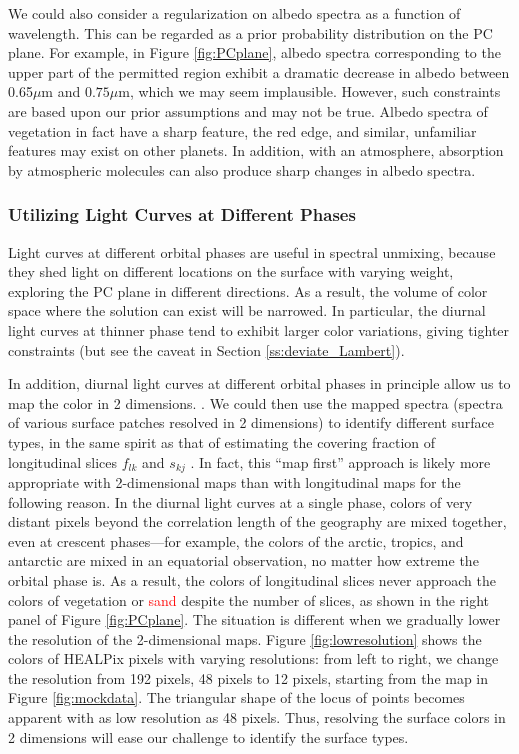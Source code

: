 \documentclass[iop,numberedappendix,apj]{emulateapj}
\def\edit#1{\textcolor{red}{#1}}
\begin{document}
We could also consider a regularization on albedo spectra as a function of wavelength. 
This can be regarded as a prior probability distribution on the PC plane. 
For example, in Figure \ref{fig:PCplane}, albedo spectra corresponding to the upper part of the permitted region exhibit a dramatic decrease in albedo between 0.65$\mu $m and $0.75\mu $m, which we may seem implausible. 
However, such constraints are based upon our prior assumptions and may not be true. 
Albedo spectra of vegetation in fact have a sharp feature, the red edge, and similar, unfamiliar features may exist on other planets. 
In addition, with an atmosphere, absorption by atmospheric molecules can also produce sharp changes in albedo spectra. 


\subsubsection{Utilizing Light Curves at Different Phases}

Light curves at different orbital phases are useful in spectral unmixing, because they shed light on different locations on the surface with varying weight, exploring the PC plane in different directions. 
As a result, the volume of color space where the solution can exist will be narrowed.  
In particular, the diurnal light curves at thinner phase tend to exhibit larger color variations, giving tighter constraints (but see the caveat in Section \ref{ss:deviate_Lambert}). 

In addition, diurnal light curves at different orbital phases in principle allow us to map the color in 2 dimensions.   \citep{Kawahara2010,Kawahara2011,Fujii2012}. 
We could then use the mapped spectra (spectra of various surface patches resolved in 2 dimensions) to identify different surface types, in the same spirit as that of estimating the covering fraction of longitudinal slices $f_{lk}$ and $s_{kj}$ . 
In fact, this ``map first'' approach is likely more appropriate with 2-dimensional maps than with longitudinal maps for the following reason. 
In the diurnal light curves at a single phase, colors of very distant pixels beyond the correlation length of the geography are mixed together, even at crescent phases---for example, the colors of the arctic, tropics, and antarctic are mixed in an equatorial observation, no matter how extreme the orbital phase is. 
As a result, the colors of longitudinal slices never approach the colors of vegetation or \edit{sand} despite the number of slices, as shown in the right panel of Figure \ref{fig:PCplane}. 
The situation is different when we gradually lower the resolution of the 2-dimensional maps. 
Figure \ref{fig:lowresolution} shows the colors of HEALPix pixels \citep{Gorski2005} with varying resolutions: from left to right, we change the resolution from 192 pixels, 48 pixels to 12 pixels, starting from the map in Figure \ref{fig:mockdata}. 
The triangular shape of the locus of points becomes apparent with as low resolution as 48 pixels. 
Thus, resolving the surface colors in 2 dimensions will ease our challenge to identify the surface types. 
\end{document}
